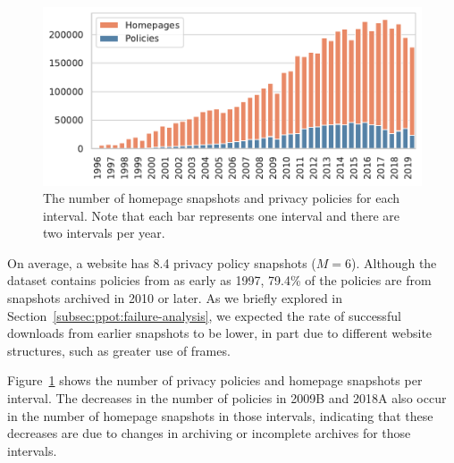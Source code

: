 \begin{figure}[]
\centering
\includegraphics[width=0.99\columnwidth]{chapters/privacypolicies/figures/policy_homepage_counts.pdf}
\caption[The number of homepage snapshots and privacy policies for each interval]{The number of homepage snapshots and privacy policies for each interval. Note that each bar represents one interval and there are two intervals per year.}
\label{fig:numpolicies}
\end{figure}

On average, a website has 8.4 privacy policy snapshots ($M=6$). Although the dataset contains policies from as early as 1997, 79.4\% of the policies are from snapshots archived in 2010 or later.
As we briefly explored in Section~\ref{subsec:ppot:failure-analysis}, we expected the rate of successful downloads from earlier snapshots to be lower, in part due to different website structures, such as greater use of frames.

Figure~\ref{fig:numpolicies} shows the number of privacy policies and homepage snapshots per interval.
The decreases in the number of policies in 2009B and 2018A also occur in the number of homepage snapshots in those intervals, indicating that these decreases are due to changes in archiving or incomplete archives for those intervals.

